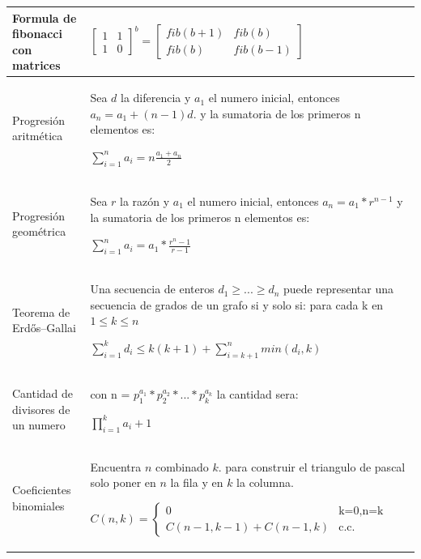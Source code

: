 \documentclass[10pt,landscape,twocolumn,letterpaper,twosided]{article}
\begin{document}
\begin{center}
{\begin{supertabular}{|p{2.2cm}|p{8.2cm}|}
					Formula de fibonacci con matrices &
					
					{\large
					$\begin{bmatrix}
						1 & 1\\ 
						1 & 0
					\end{bmatrix}^{b} =
					\begin{bmatrix}
						fib(b+1) & fib(b) \\ 
						fib(b) & fib(b-1)
					\end{bmatrix}$}
					\\ \hline
					
					Progresión aritmética & Sea $d$ la diferencia y $a_{1}$ el numero inicial, entonces $a_{n} = 
					a_{1}+(n-1)d$. y la sumatoria de los primeros n elementos es:
					
					\vspace{1mm}
					{\Large$\sum_{i=1}^{n}a_{i} = n\frac{a_{1}+a_{n}}{2}$}
					\\ \hline
					
					Progresión geométrica & Sea $r$ la razón y $a_{1}$ el numero inicial, entonces $a_{n} = 
					a_{1}*r^{n-1}$ y la sumatoria de los primeros n elementos es:
					
					{\large
					$\sum_{i=1}^{n}a_{i} = a_{1} * \frac{r^{n}-1}{r-1}$}
					\\ \hline
					
					Teorema de Erd\H{o}s–Gallai & Una secuencia de enteros $d_{1} \geq ... \geq d_{n}$ puede 
					representar una secuencia de grados de un grafo si y solo si: para cada k en $1 \leq k \leq n$
					
					{\large
					$\sum_{i=1}^{k} d_{i} \leq k(k+1)+\sum_{i=k+1}^{n} min(d_{i},k)$}
					\\ \hline
					
					Cantidad de divisores de un numero & con n = $p_{1}^{a_{1}}*p_{2}^{a_{2}}*...*p_{k}^{a_{k}}$ 
					la cantidad sera:
					
					{\Large$\prod_{i=1}^{k} a_{i}+1$}
					\\ \hline
					
					Coeficientes binomiales & Encuentra $n$ combinado $k$. para construir el triangulo de pascal 
					solo poner en $n$ la fila y en $k$ la columna.
					
					$C(n, k) = 	
					\begin{cases}
						0 & \text{k=0,n=k}\\
						C(n-1,k-1)+C(n-1,k) & \text{c.c.}
					\end{cases}
					$
					\\ \hline
					

\end{supertabular}}
\end{center}
\end{document}
